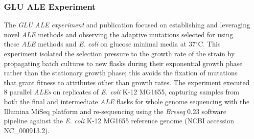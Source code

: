 \documentclass[12pt,final,masters,chapterheads]{ucsd}  %
\begin{document}
\subsubsection{GLU ALE Experiment}
%
%
The \textit{GLU} \textit{ALE experiment} and publication focused on establishing and leveraging novel \textit{ALE} methods and observing the adaptive mutations selected for using these \textit{ALE} methods and \textit{E. coli} on glucose minimal media at 37$^{\circ}$C. This experiment isolated the selection pressure to the growth rate of the strain by propagating batch cultures to new flasks during their exponential growth phase rather than the stationary growth phase; this avoids the fixation of mutations that grant fitness to attributes other than growth rates. The experiment executed 8 parallel \textit{ALEs} on replicates of \textit{E. coli} K-12 MG1655, capturing samples from both the final and intermediate \textit{ALE} flasks for whole genome sequencing with the Illumina MiSeq platform and re-sequencing using the \textit{Breseq} 0.23 software pipeline against the \textit{E. coli} K-12 MG1655 reference genome (NCBI accession NC\_000913.2).
\end{document}
